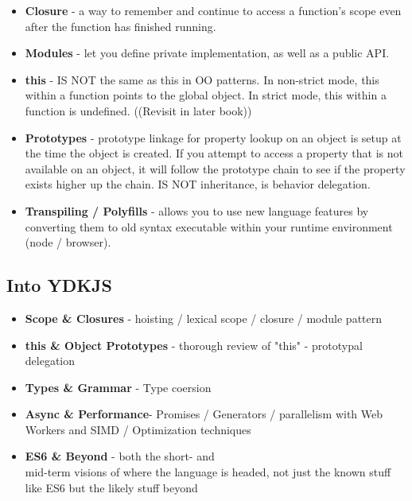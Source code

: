 \begin{itemize}
\item \textbf{Closure} - a way to remember and continue to access a function's scope even after the function has finished running.
\item \textbf{Modules} - let you define private implementation, as well as a public API.
\item \textbf{this} - IS NOT the same as this in OO patterns. In non-strict mode, this within a function points to the global object. In strict mode, this within a function is undefined. ((Revisit in later book))
\item \textbf{Prototypes} - prototype linkage for property lookup on an object is setup at the time the object is created. If you attempt to access a property that is not available on an object, it will follow the prototype chain to see if the property exists higher up the chain. IS NOT inheritance, is behavior delegation.
\item \textbf{Transpiling / Polyfills} - allows you to use new language features by converting them to old syntax executable within your runtime environment (node / browser).
\end{itemize}
\subsection{Into YDKJS}
\begin{itemize}
\item \textbf{Scope \& Closures} - hoisting / lexical scope / closure / module pattern
\item \textbf{this \& Object Prototypes} - thorough review of "this" - prototypal delegation
\item \textbf{Types \& Grammar} - Type coersion
\item \textbf{Async \& Performance}- Promises / Generators / parallelism with Web Workers and SIMD / Optimization techniques
\item \textbf{ES6 \& Beyond} - both the short- and \\mid-term visions of where the language is headed, not just the known stuff like ES6 but the likely stuff beyond
\end{itemize}

\onecolumn

